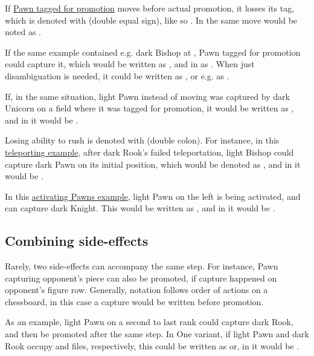If \hyperref[fig:scn_aoa_04_delayed_promo_pawn_2_tagged]{Pawn tagged for promotion}
moves before actual promotion, it losses its tag, which is denoted with \alg{==}
(double equal sign), like so . In  the same move would be
noted as .

If the same example contained e.g. dark Bishop at , Pawn tagged for promotion
could capture it, which would be written as , and in  as
. When just disambiguation is needed, it could be written as
, or e.g. as .

If, in the same situation, light Pawn instead of moving was captured by dark Unicorn
on a field where it was tagged for promotion, it would be written as ,
and in  it would be .

Losing ability to rush is denoted with \alg{::} (double colon). For instance, in
this \hyperref[fig:scn_n_03_teleport_move_2]{teleporting example}, after dark Rook's
failed teleportation, light Bishop could capture dark Pawn on its initial position,
which would be denoted as , and in  it would be
.

In this \hyperref[fig:scn_mv_36_activating_rush_pawn_init]{activating Pawns example},
light Pawn on the left is being activated, and can capture dark Knight. This would
be written as , and in  it would be
\alg{[Re6-e2]\~{}[We2-c2]\~{}[P::c2-b3*N]}.

\subsection*{Combining side-effects}
\label{sec:Appendix/Notation/Combining side-effects}

Rarely, two side-effects can accompany the same step. For instance, Pawn capturing
opponent's piece can also be promoted, if capture happened on opponent's figure row.
Generally, notation follows order of actions on a chessboard, in this case a capture
would be written before promotion.

As an example, light Pawn on a second to last rank could capture dark Rook, and
then be promoted after the same step. In One variant, if light Pawn and dark Rook
occupy  and  files, respectively, this could be written as
 or, in  it would be .

